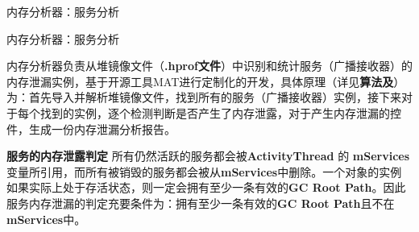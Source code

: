 \begin{algorithm}
	\caption{内存分析器：服务分析}
	\label{alg:memory analyser:service}
	\begin{algorithmic}[1]
					\ELSE
					\ENDIF
				\ENDIF
			\ENDIF
		\ENDFOR
	\end{algorithmic}
\end{algorithm}

\begin{algorithm}
	\caption{内存分析器：服务分析}
	\label{alg:memory analyser:receiver}
	\begin{algorithmic}[1]
					\ELSE
					\ENDIF
				\ENDIF
			\ENDIF
		\ENDFOR
	\end{algorithmic}
\end{algorithm}

内存分析器负责从堆镜像文件（\textbf{.hprof文件}）中识别和统计服务（广播接收器）的内存泄漏实例，基于开源工具MAT\cite{mat}进行定制化的开发，具体原理（详见\textbf{算法\redbf{\ref{alg:memory analyser:service}}及\redbf{\ref{alg:memory analyser:receiver}}}）为：首先导入并解析堆镜像文件，找到所有的服务（广播接收器）实例，接下来对于每个找到的实例，逐个检测判断是否产生了内存泄露，对于产生内存泄漏的控件，生成一份内存泄漏分析报告。

\textbf{服务的内存泄露判定 } 所有仍然活跃的服务都会被\textbf{ActivityThread} 的 \textbf{mServices}变量所引用，而所有被销毁的服务都会被从\textbf{mServices}中删除。一个对象的实例如果实际上处于存活状态，则一定会拥有至少一条有效的\textbf{GC Root Path}。因此服务内存泄漏的判定充要条件为：拥有至少一条有效的\textbf{GC Root Path}且不在\textbf{mServices}中。

